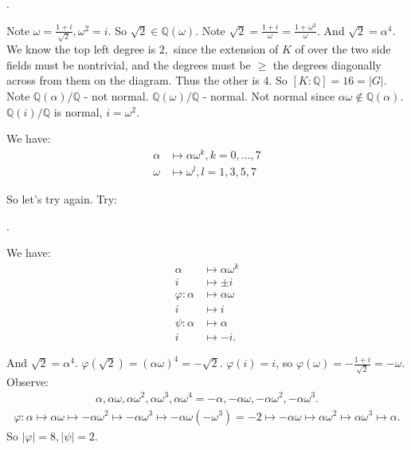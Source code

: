 \documentclass[9pt,reqno,twoside]{amsbook}
\theoremstyle{plain}
\numberwithin{section}{chapter}
\numberwithin{equation}{chapter}
\theoremstyle{definition}
\theoremstyle{remark}
\theoremstyle{plain}
\newcommand{\Q}{\mathbb{Q}}
\newcommand{\bb}{\vspace{3mm}}
\newcommand{\bee}{\begin{equation}\begin{aligned}}
\newcommand{\eee}{\end{aligned}\end{equation}}
\newcommand{\fracc}{\frac}
\renewcommand{\geq}{\geqslant}
\renewcommand{\phi}{\varphi}
\begin{document}
\begin{enumerate}[label=\arabic*.]
\begin{center}
.
\end{center}

Note $\omega = \fracc{1 + i}{\sqrt{2}}, \omega^2 = i$. So $\sqrt{2} \in \Q(\omega)$. Note $\sqrt{2} = \fracc{1 + i}{\omega} = \fracc{1 + \omega^2}{\omega}$. And $\sqrt{2} = \alpha^4$. We know the top left degree is $2,$ since the extension of $K$ of over the two side fields must be nontrivial, and the degrees must be $\geq$ the degrees diagonally across from them on the diagram. Thus the other is 4. So $[K:\Q] = 16 = |G|$. Note $\Q(\alpha)/\Q$ - not normal. $\Q(\omega)/\Q$ - normal. Not normal since $\alpha \omega \notin \Q(\alpha)$. $\Q(i)/\Q$ is normal, $i = \omega^2$. 

\bb

We have:
\bee
\alpha &\mapsto \alpha\omega^k, k = 0,...,7\\
\omega &\mapsto \omega^l, l = 1,3,5,7
\eee

So let's try again. Try:
\begin{center}
.
\end{center}
We have:
\bee
\alpha &\mapsto \alpha\omega^k\\
i &\mapsto \pm i\\
\phi: \alpha &\mapsto \alpha \omega\\
i &\mapsto i\\
\psi: \alpha &\mapsto \alpha\\
i &\mapsto -i.
\eee

And $\sqrt{2} = \alpha^4$. $\phi(\sqrt{2}) = (\alpha\omega)^4 = -\sqrt{2}$. $\phi(i) = i$, so $\phi(\omega) = -\fracc{1 + i}{\sqrt{2}} = -\omega$. Observe:
\bee
\alpha,\alpha\omega,\alpha\omega^2,\alpha\omega^3, \alpha\omega^4 = -\alpha,-\alpha\omega,-\alpha\omega^2,-\alpha\omega^3.
\eee
\bee
\phi:\alpha \mapsto \alpha\omega \mapsto -\alpha\omega^2\mapsto-\alpha\omega^3\mapsto-\alpha\omega(-\omega^3) = -2 \mapsto-\alpha\omega \mapsto \alpha\omega^2 \mapsto \alpha\omega^3 \mapsto \alpha.
\eee
So $|\phi| = 8,|\psi| = 2$. 


\end{enumerate}
\end{document}
